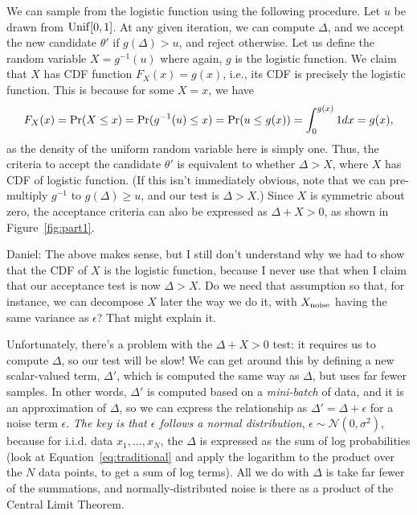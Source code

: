 \documentclass{article}
\begin{document}
We can sample from the logistic function using the following procedure. Let $u$ be drawn from ${\rm
Unif}[0,1]$. At any given iteration, we can compute $\Delta$, and we accept the new candidate
$\theta'$ if $g(\Delta) > u$, and reject otherwise. Let us define the random variable $X =
g^{-1}(u)$ where again, $g$ is the logistic function. We claim that $X$ has CDF function $F_X(x) =
g(x)$, i.e., its CDF is precisely the logistic function. This is because for some $X = x$, we have
\[
F_X(x) = {\rm Pr}(X \le x) = {\rm Pr}(g^{-1}(u) \le x) = {\rm Pr}(u \le g(x)) = \int_{0}^{g(x)} 1 dx = g(x),
\]
as the density of the uniform random variable here is simply one. Thus, the criteria to accept the
candidate $\theta'$ is equivalent to whether $\Delta > X$, where $X$ has CDF of logistic function.
(If this isn't immediately obvious, note that we can pre-multiply $g^{-1}$ to $g(\Delta) \ge u$, and
our test is $\Delta > X$.) Since $X$ is symmetric about zero, the acceptance criteria can also be
expressed as $\Delta + X>0$, as shown in Figure~\ref{fig:part1}.

{\color{blue}
Daniel: The above makes sense, but I still don't understand why we had to show that the CDF of $X$
is the logistic function, because I never use that when I claim that our acceptance test is now
$\Delta > X$.  Do we need that assumption so that, for instance, we can decompose $X$ later the way
we do it, with $X_{\rm noise}$ having the same variance as $\epsilon$? That might explain it.
}

Unfortunately, there's a problem with the $\Delta + X > 0$ test: it requires us to compute $\Delta$,
so our test will be slow! We can get around this by defining a new scalar-valued term, $\Delta'$, which is
computed the same way as $\Delta$, but uses far fewer samples. In other words, $\Delta'$ is computed
based on a \emph{mini-batch} of data, and it is an approximation of $\Delta$, so we can express the
relationship as $\Delta' = \Delta + \epsilon$ for a noise term $\epsilon$. \emph{The key is that
$\epsilon$ follows a normal distribution}, $\epsilon \sim \mathcal{N}(0, \sigma^2)$, because for i.i.d. data $x_1, \ldots, x_N$, the $\Delta$
is expressed as the sum of log probabilities (look at Equation~\ref{eq:traditional} and apply the
logarithm to the product over the $N$ data points, to get a sum of log terms). All we do with
$\Delta$ is take far fewer of the summations, and normally-distributed noise is there as a product
of the Central Limit Theorem.
\end{document}
